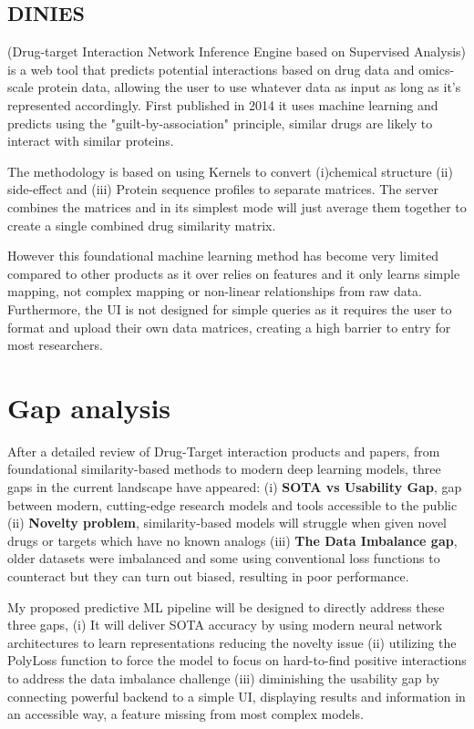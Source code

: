 \subsection{DINIES} \citep{Yamanishi2014} \citep{DINIES_web} (Drug-target Interaction Network Inference Engine based on Supervised Analysis) is a web tool that predicts potential interactions based on drug data and omics-scale protein data, allowing the user to use whatever data as input as long as it's represented accordingly. First published in 2014 it uses machine learning and predicts using the "guilt-by-association" principle, similar drugs are likely to interact with similar proteins.

The methodology is based on using Kernels to convert (i)chemical structure (ii) side-effect and (iii) Protein sequence profiles to separate matrices. The server combines the matrices and in its simplest mode will just average them together to create a single combined drug similarity matrix.

However this foundational machine learning method has become very limited compared to other products as it over relies on features and it only learns simple mapping, not complex mapping or non-linear relationships from raw data. Furthermore, the UI is not designed for simple queries as it requires the user to format and upload their own data matrices, creating a high barrier to entry for most researchers.


\section{Gap analysis}
After a detailed review of Drug-Target interaction products and papers, from foundational similarity-based methods to modern deep learning models, three gaps in the current landscape have appeared: (i) \textbf{SOTA vs Usability Gap}, gap between modern, cutting-edge research models and tools accessible to the public (ii) \textbf{Novelty problem}, similarity-based models will struggle when given novel drugs or targets which have no known analogs (iii) \textbf{The Data Imbalance gap}, older datasets were imbalanced and some using conventional loss functions to counteract but they can turn out biased, resulting in poor performance.

My proposed predictive ML pipeline will be designed to directly address these three gaps, (i) It will deliver SOTA accuracy by using modern neural network architectures to learn representations reducing the novelty issue (ii) utilizing the PolyLoss function to force the model to focus on hard-to-find positive interactions to address the data imbalance challenge (iii) diminishing the usability gap by connecting powerful backend to a simple UI, displaying results and information in an accessible way, a feature missing from most complex models.



